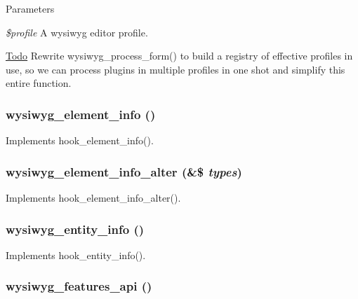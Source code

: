 \begin{DoxyParams}{Parameters}
\item[{\em \$profile}]A wysiwyg editor profile.\end{DoxyParams}
\begin{Desc}
\item[\hyperlink{todo__todo000065}{Todo}]Rewrite wysiwyg\_\-process\_\-form() to build a registry of effective profiles in use, so we can process plugins in multiple profiles in one shot and simplify this entire function. \end{Desc}
\hypertarget{wysiwyg_8module_a558b7da961229a8d501fa8581d802093}{
\subsubsection[{wysiwyg\_\-element\_\-info}]{\setlength{\rightskip}{0pt plus 5cm}wysiwyg\_\-element\_\-info ()}}
\label{wysiwyg_8module_a558b7da961229a8d501fa8581d802093}
Implements hook\_\-element\_\-info(). \hypertarget{wysiwyg_8module_aa482dbbc6100de3682a8deb035a03ed5}{
\subsubsection[{wysiwyg\_\-element\_\-info\_\-alter}]{\setlength{\rightskip}{0pt plus 5cm}wysiwyg\_\-element\_\-info\_\-alter (\&\$ {\em types})}}
\label{wysiwyg_8module_aa482dbbc6100de3682a8deb035a03ed5}
Implements hook\_\-element\_\-info\_\-alter(). \hypertarget{wysiwyg_8module_abb82c2196b81d43dfdfe589eaf10a410}{
\subsubsection[{wysiwyg\_\-entity\_\-info}]{\setlength{\rightskip}{0pt plus 5cm}wysiwyg\_\-entity\_\-info ()}}
\label{wysiwyg_8module_abb82c2196b81d43dfdfe589eaf10a410}
Implements hook\_\-entity\_\-info(). \hypertarget{wysiwyg_8module_a50b7a796362c1595678743fc3d4307d7}{
\subsubsection[{wysiwyg\_\-features\_\-api}]{\setlength{\rightskip}{0pt plus 5cm}wysiwyg\_\-features\_\-api ()}}
